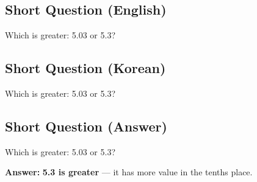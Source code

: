 \cleardoublepage
\subsection*{Short Question (English)}
Which is greater: 5.03 or 5.3?


\newpage
\subsection*{Short Question (Korean)}
Which is greater: 5.03 or 5.3?


\newpage
\subsection*{Short Question (Answer)}
Which is greater: 5.03 or 5.3?

\textbf{Answer:} \textbf{5.3 is greater} — it has more value in the tenths place.
